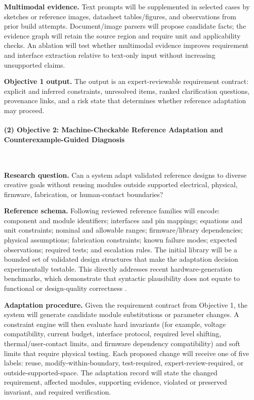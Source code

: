 \documentclass[11pt,letterpaper]{article}
\begin{document}
\textbf{Multimodal evidence.} Text prompts will be supplemented in selected cases by sketches or reference images, datasheet tables/figures, and observations from prior build attempts. Document/image parsers will propose candidate facts; the evidence graph will retain the source region and require unit and applicability checks. An ablation will test whether multimodal evidence improves requirement and interface extraction relative to text-only input without increasing unsupported claims.

\textbf{Objective 1 output.} The output is an expert-reviewable requirement contract: explicit and inferred constraints, unresolved items, ranked clarification questions, provenance links, and a risk state that determines whether reference adaptation may proceed.

\paragraph{(2) Objective 2: Machine-Checkable Reference Adaptation and Counterexample-Guided Diagnosis}~{} %

\textbf{Research question.} Can a system adapt validated reference designs to diverse creative goals without reusing modules outside supported electrical, physical, firmware, fabrication, or human-contact boundaries?

\textbf{Reference schema.} Following reviewed reference families will encode: component and module identifiers; interfaces and pin mappings; equations and unit constraints; nominal and allowable ranges; firmware/library dependencies; physical assumptions; fabrication constraints; known failure modes; expected observations; required tests; and escalation rules. 
The initial library will 
be a bounded set of validated design structures that make the adaptation decision experimentally testable. This directly addresses recent hardware-generation benchmarks, which demonstrate that syntactic plausibility does not equate to functional or design-quality correctness \cite{liu2023verilogeval,thakur2024verigen,lu2024rtllm}.

\textbf{Adaptation procedure.} Given the requirement contract from Objective 1, the system will generate candidate module substitutions or parameter changes. A constraint engine will then evaluate hard invariants (for example, voltage compatibility, current budget, interface protocol, required level shifting, thermal/user-contact limits, and firmware dependency compatibility) and soft limits that require physical testing. Each proposed change will receive one of five labels: reuse, modify-within-boundary, test-required, expert-review-required, or outside-supported-space. The adaptation record will state the changed requirement, affected modules, supporting evidence, violated or preserved invariant, and required verification.
\end{document}
